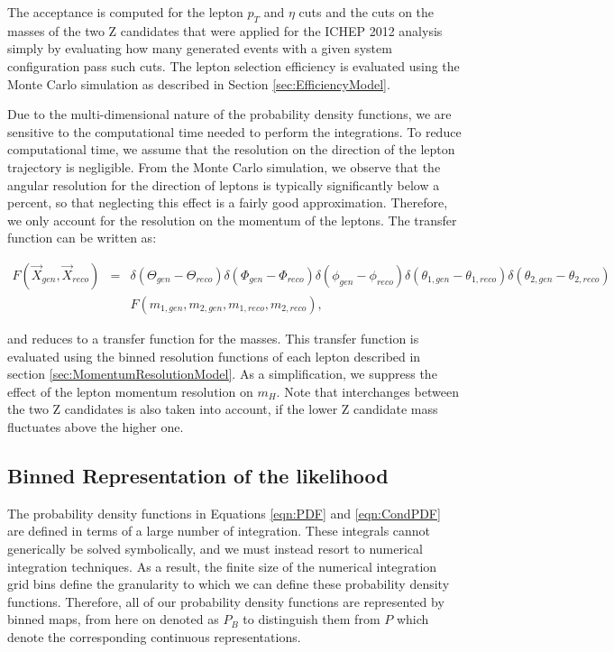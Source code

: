 \documentclass{cmspaper}
\begin{document}
The acceptance is computed for the lepton $p_{T}$ and $\eta$ cuts and the cuts on the
masses of the two Z candidates that were applied for the ICHEP 2012 analysis simply
by evaluating how many generated events with a given system configuration pass such cuts. 
The lepton selection efficiency is evaluated using the Monte Carlo simulation as described
in Section \ref{sec:EfficiencyModel}.

Due to the multi-dimensional nature of the probability density functions, we are 
sensitive to the computational time needed to perform the integrations. 
To reduce computational time, we assume that the resolution on the direction of the 
lepton trajectory is negligible. From the Monte Carlo simulation, we observe that
the angular resolution for the direction of leptons is typically significantly below 
a percent, so that neglecting this effect is a fairly good approximation. 
Therefore, we only account for the resolution on the momentum of the leptons.
The transfer function can be written as:

\begin{eqnarray}
F(\vec{X}_{gen}, \vec{X}_{reco}) &=& \delta (\Theta_{gen} - \Theta_{reco})
   \delta (\Phi_{gen} - \Phi_{reco})
   \delta (\phi_{gen} - \phi_{reco})
   \delta (\theta_{1, gen} - \theta_{1, reco})
   \delta (\theta_{2, gen} - \theta_{2, reco}) \nonumber\\
   &\,& F(m_{1, gen}, m_{2, gen}, m_{1, reco}, m_{2, reco}), 
\end{eqnarray}

and reduces to a transfer function for the masses. This transfer function is 
evaluated using the binned resolution functions of each lepton described
in section \ref{sec:MomentumResolutionModel}. As a simplification, 
we suppress the effect of the lepton momentum resolution on $m_H$.  
Note that interchanges between the two Z candidates 
is also taken into account, if the lower Z candidate mass fluctuates
above the higher one.


\subsection{Binned Representation of the likelihood}

The probability density functions in Equations \ref{eqn:PDF}
and \ref{eqn:CondPDF} are defined in terms of a large number of integration. These integrals 
cannot generically be solved symbolically, and we must instead resort to numerical 
integration techniques. As a result, the finite size of the numerical integration
grid bins define the granularity to which we can define these probability
density functions. Therefore, all of our probability density functions
are represented by binned maps, from here on denoted as $P_B$ to 
distinguish them from $P$ which denote the corresponding continuous representations.
\end{document}
